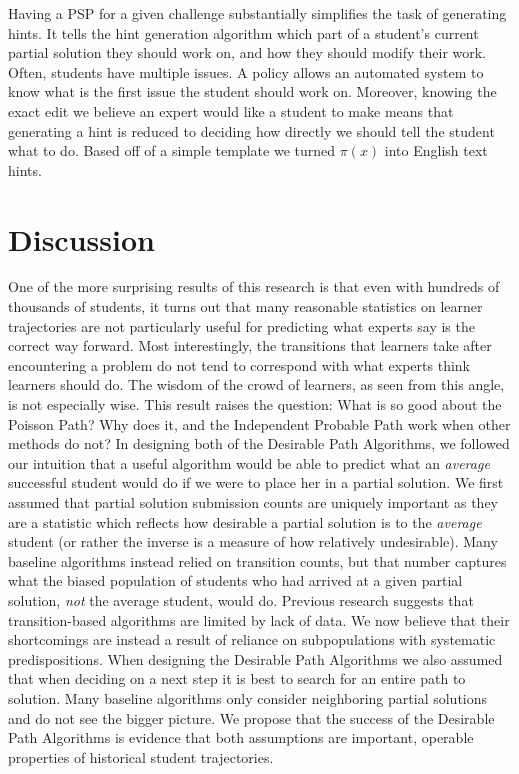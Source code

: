 Having a PSP for a given challenge substantially simplifies the task of generating hints. It tells the hint generation algorithm which part of a student's current partial solution they should work on, and how they should modify their work. Often, students have multiple issues. A policy allows an automated system to know what is the first issue the student should work on. Moreover, knowing the exact edit we believe an expert would like a student to make means that generating a hint is reduced to deciding how directly we should tell the student what to do. Based off of a simple template we turned $\pi(x)$ into English text hints. 

\section{Discussion}

One of the more surprising results of this research is that even with hundreds of thousands of students, it turns out that many reasonable statistics on learner trajectories are not particularly useful for predicting what experts say is the correct way forward. Most interestingly, the transitions that learners take after encountering a problem do not tend to correspond with what experts think learners should do. The wisdom of the crowd of learners, as seen from this angle, is not especially wise. This result raises the question: What is so good about the Poisson Path? Why does it, and the Independent Probable Path work when other methods do not? In designing both of the Desirable Path Algorithms, we followed our intuition that a useful algorithm would be able to predict what an \emph{average} successful student would do if we were to place her in a partial solution. We first assumed that partial solution submission counts are uniquely important as they are a statistic which reflects how desirable a partial solution is to the \emph{average} student (or rather the inverse is a measure of how relatively undesirable). Many baseline algorithms instead relied on transition counts, but that number captures what the biased population of students who had arrived at a given partial solution, \emph{not} the average student, would do. Previous research suggests that transition-based algorithms are limited by lack of data. We now believe that their shortcomings are instead a result of reliance on subpopulations with systematic predispositions. When designing the Desirable Path Algorithms we also assumed that when deciding on a next step it is best to search for an entire path to solution. Many baseline algorithms only consider neighboring partial solutions and do not see the bigger picture. We propose that the success of the Desirable Path Algorithms is evidence that both assumptions are important, operable properties of historical student trajectories. 

